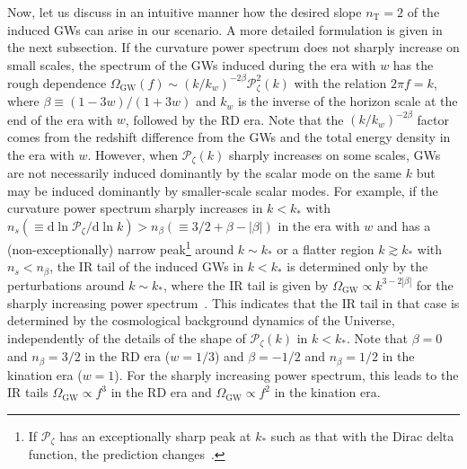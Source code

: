 \documentclass[superscriptaddress, aps, preprintnumbers,
amsmath, amssymb, sort&compress, nofootinbib, 10pt, paper, floatfix]{revtex4-2}
\newcommand{\dd}{\mathrm{d}}
\newcommand{\GW}{\text{GW}}
\begin{document}
Now, let us discuss in an intuitive manner how the desired slope $n_\text{T}=2$ of the induced GWs can arise in our scenario. A more detailed formulation is given in the next subsection.
If the curvature power spectrum does not sharply increase on small scales, the spectrum of the GWs induced during the era with $w$ has the rough dependence $\Omega_\text{GW}(f) \sim (k/k_w)^{-2\beta} \mathcal{P}^2_\zeta(k)$ with the relation $2\pi f = k$, where $\beta \equiv (1-3w)/(1+3w)$ and $k_w$ is the inverse of the horizon scale at the end of the era with $w$, followed by the RD era.
Note that the $(k/k_w)^{-2\beta}$ factor comes from the redshift difference from the GWs and the total energy density in the era with $w$.
However, when $\mathcal{P}_\zeta (k)$ sharply increases on some scales, GWs are not necessarily induced dominantly by the scalar mode on the same $k$ but may be induced dominantly by smaller-scale scalar modes.
For example, if the curvature power spectrum sharply increases in $k < k_*$ with $n_s (\equiv \dd \ln \mathcal P_\zeta/\dd \ln k) > n_\beta (\equiv 3/2 + \beta - |\beta|)$ in the era with $w$ and has a (non-exceptionally) narrow peak\footnote{If $\mathcal P_\zeta$ has an exceptionally sharp peak at $k_*$ such as that with the Dirac delta function, the prediction changes~\cite{Espinosa:2018eve, Pi:2020otn, Domenech:2020kqm,Liu:2023pau}.} around $k \sim k_*$ or a flatter region $k \gtrsim k_*$ with $n_s < n_\beta$, the IR tail of the induced GWs in $k < k_*$ is determined only by the perturbations around $k\sim k_*$, where the IR tail is given by $\Omega_\GW \propto k^{3-2|\beta|}$ for the sharply increasing power spectrum~\cite{Domenech:2020kqm}.
This indicates that the IR tail in that case is determined by the cosmological background dynamics of the Universe, independently of the details of the shape of $\mathcal{P}_\zeta (k)$ in $k < k_*$. 
Note that $\beta=0$ and $n_\beta = 3/2$ in the RD era ($w=1/3$) and $\beta = -1/2$ and $n_\beta = 1/2$ in the kination era ($w=1$). 
For the sharply increasing power spectrum, this leads to the IR tails $\Omega_\GW \propto f^3$ in the RD era and $\Omega_\GW \propto f^2$ in the kination era.
\end{document}
